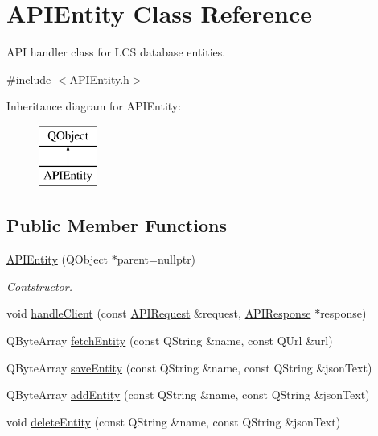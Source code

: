 \hypertarget{class_a_p_i_entity}{}\section{A\+P\+I\+Entity Class Reference}
\label{class_a_p_i_entity}


A\+PI handler class for L\+CS database entities.  




{\ttfamily \#include $<$A\+P\+I\+Entity.\+h$>$}

Inheritance diagram for A\+P\+I\+Entity\+:\begin{figure}[H]
\begin{center}
\leavevmode
\includegraphics[height=2.000000cm]{class_a_p_i_entity}
\end{center}
\end{figure}
\subsection*{Public Member Functions}
\begin{DoxyCompactItemize}
\item 
\mbox{\label{class_a_p_i_entity_a1408a64bcc760d3add4f9d5d67903e96}} 
\hyperlink{class_a_p_i_entity_a1408a64bcc760d3add4f9d5d67903e96}{A\+P\+I\+Entity} (Q\+Object $\ast$parent=nullptr)
\begin{DoxyCompactList}\small\item\em Contstructor. \end{DoxyCompactList}\item 
void \hyperlink{class_a_p_i_entity_a66ea6b2523afbb3acebaadf3aea1ec6c}{handle\+Client} (const \hyperlink{class_a_p_i_request}{A\+P\+I\+Request} \&request, \hyperlink{class_a_p_i_response}{A\+P\+I\+Response} $\ast$response)
\item 
Q\+Byte\+Array \hyperlink{class_a_p_i_entity_a4ff9b9128b1ad595dd07006544c99dee}{fetch\+Entity} (const Q\+String \&name, const Q\+Url \&url)
\item 
Q\+Byte\+Array \hyperlink{class_a_p_i_entity_a5f2de518701f362000bb6eb341fbf95b}{save\+Entity} (const Q\+String \&name, const Q\+String \&json\+Text)
\item 
Q\+Byte\+Array \hyperlink{class_a_p_i_entity_a8bbe43bbc389472d7a7fd9e8a2283c82}{add\+Entity} (const Q\+String \&name, const Q\+String \&json\+Text)
\item 
void \hyperlink{class_a_p_i_entity_ade40ac225523f1d00ed7c1eb8bdfec96}{delete\+Entity} (const Q\+String \&name, const Q\+String \&json\+Text)
\end{DoxyCompactItemize}


